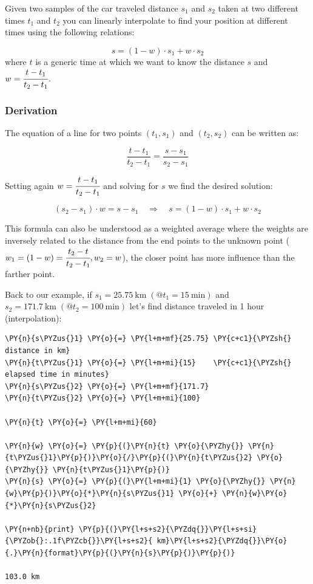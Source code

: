 Given two samples of the car traveled distance \(s_1\) and \(s_2\) taken at two different times \(t_1\) and \(t_2\) you can linearly interpolate to find your position at different times using the following relations:

\[s = (1 - w)\cdot s_1 + w \cdot s_2\]
where $t$ is a generic time at which we want to know the distance $s$ and \(w = \cfrac{t - t_1}{t_2 - t_1}\).

\subsubsection{Derivation}
The equation of a line for two points
\((t_1, s_1)\) and \((t_2, s_2)\) can be written as:

\[\frac{t - t_1}{t_2 - t_1} = \frac{s - s_1}{s_2 - s_1}\]

Setting again \(w = \cfrac{t - t_1}{t_2 - t_1}\) and solving for \(s\) we find the desired solution:

\[(s_2 - s_1)\cdot w = s - s_1\quad\Rightarrow\quad s = (1 - w)\cdot s_1 + w \cdot s_2\]

This formula can also be understood as a weighted average where the weights are inversely related to the distance from the end points to the unknown point ($w_1 = (1 - w) = \cfrac{t_2 - t}{t_2 -t_1}, w_2 = w$), the closer point has more influence than the farther point.

Back to our example, if
\(s_1 = 25.75~\mathrm{km}\;(@t_1 = 15~\mathrm{min})\) and
\(s_2 = 171.7~\mathrm{km}\;(@t_2 = 100~\mathrm{min})\) let's find distance traveled in 1 hour (interpolation):

\begin{tcolorbox}[breakable, size=fbox, boxrule=1pt, pad at break*=1mm,colback=cellbackground, colframe=cellborder]
\begin{Verbatim}[commandchars=\\\{\}]
\PY{n}{s\PYZus{}1} \PY{o}{=} \PY{l+m+mf}{25.75} \PY{c+c1}{\PYZsh{} distance in km}
\PY{n}{t\PYZus{}1} \PY{o}{=} \PY{l+m+mi}{15}    \PY{c+c1}{\PYZsh{} elapsed time in minutes}
\PY{n}{s\PYZus{}2} \PY{o}{=} \PY{l+m+mf}{171.7}
\PY{n}{t\PYZus{}2} \PY{o}{=} \PY{l+m+mi}{100}

\PY{n}{t} \PY{o}{=} \PY{l+m+mi}{60}

\PY{n}{w} \PY{o}{=} \PY{p}{(}\PY{n}{t} \PY{o}{\PYZhy{}} \PY{n}{t\PYZus{}1}\PY{p}{)}\PY{o}{/}\PY{p}{(}\PY{n}{t\PYZus{}2} \PY{o}{\PYZhy{}} \PY{n}{t\PYZus{}1}\PY{p}{)}
\PY{n}{s} \PY{o}{=} \PY{p}{(}\PY{l+m+mi}{1} \PY{o}{\PYZhy{}} \PY{n}{w}\PY{p}{)}\PY{o}{*}\PY{n}{s\PYZus{}1} \PY{o}{+} \PY{n}{w}\PY{o}{*}\PY{n}{s\PYZus{}2}

\PY{n+nb}{print} \PY{p}{(}\PY{l+s+s2}{\PYZdq{}}\PY{l+s+si}{\PYZob{}:.1f\PYZcb{}}\PY{l+s+s2}{ km}\PY{l+s+s2}{\PYZdq{}}\PY{o}{.}\PY{n}{format}\PY{p}{(}\PY{n}{s}\PY{p}{)}\PY{p}{)}

103.0 km
\end{Verbatim}
\end{tcolorbox}

